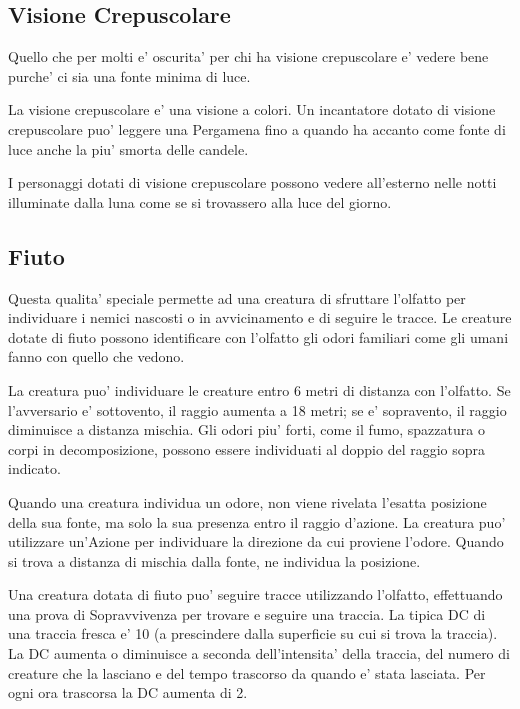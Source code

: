 \documentclass[a4paper,11pt,twoside,openany]{book}
\begin{document}
\subsection{Visione Crepuscolare}

Quello che per molti e’ oscurita’ per chi ha visione crepuscolare e’ vedere bene purche’ ci sia una fonte minima di luce.

La visione crepuscolare e' una visione a colori.
Un incantatore dotato di visione crepuscolare puo' leggere una Pergamena fino a quando ha accanto come fonte di luce anche la piu' smorta delle candele.

I personaggi dotati di visione crepuscolare possono vedere all’esterno nelle notti illuminate dalla luna come se si trovassero alla luce del giorno.

\subsection{Fiuto}

Questa qualita’ speciale permette ad una creatura di sfruttare l'olfatto per individuare i nemici nascosti o in avvicinamento e di seguire le tracce. Le creature dotate di fiuto possono identificare con l'olfatto gli odori familiari come gli umani fanno con quello che vedono.

La creatura puo' individuare le creature entro 6 metri di distanza con l'olfatto. Se l'avversario e' sottovento, il raggio aumenta a 18 metri; se e' sopravento, il raggio diminuisce a distanza mischia.
Gli odori piu' forti, come il fumo, spazzatura o corpi in decomposizione, possono essere individuati al doppio del raggio sopra indicato.

Quando una creatura individua un odore, non viene rivelata l'esatta posizione della sua fonte, ma solo la sua presenza entro il raggio d'azione. La creatura puo' utilizzare un'Azione per individuare la direzione da cui proviene l'odore. Quando si trova a distanza di mischia dalla fonte, ne individua la posizione.

Una creatura dotata di fiuto puo' seguire tracce utilizzando l'olfatto, effettuando una prova di Sopravvivenza per trovare e seguire una traccia. La tipica DC di una traccia fresca e' 10 (a prescindere dalla superficie su cui si trova la traccia). La DC aumenta o diminuisce a seconda dell'intensita' della traccia, del numero di creature che la lasciano e del tempo trascorso da quando e' stata lasciata. Per ogni ora trascorsa la DC aumenta di 2.
\end{document}
